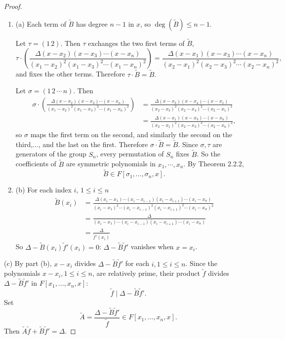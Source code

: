 \documentclass[11pt,a4paper]{article}
\newcommand{\be} {\begin{enumerate}}
\newcommand{\ee} {\end{enumerate}}
\begin{document}
\begin{proof}
\be
\item[(a)]
Each term of $\tilde{B}$ has degree $n-1$ in $x$, so $\deg(\tilde{B}) \leq n-1$.

Let $\tau = (1\, 2)$. Then $\tau$ exchanges the two first terms of $\tilde{B}$,
$$\tau \cdot \left( \frac{\Delta(x-x_2)(x-x_3)\cdots(x-x_n)}{(x_1-x_2)^2(x_1-x_3)^2\cdots(x_1-x_n)^2}\right) = \frac{\Delta(x-x_1)(x-x_3)\cdots(x-x_n)}{(x_2-x_1)^2(x_2-x_3)^2\cdots(x_2-x_n)^2},$$
and fixes the other terms. Therefore $\tau \cdot \tilde{B} = \tilde{B}.$

Let $\sigma = (1\,2\,\cdots\, n)$. Then 
\begin{align*}
\sigma \cdot \left( \frac{\Delta(x-x_2)(x-x_3)\cdots(x-x_n)}{(x_1-x_2)^2(x_1-x_3)^2\cdots(x_1-x_n)^2}\right) &= \frac{\Delta(x-x_3)(x-x_4)\cdots(x-x_1)}{(x_2-x_3)^2(x_2-x_4)^2\cdots(x_2-x_1)^2}\\
&=\frac{\Delta(x-x_1)(x-x_3)\cdots(x-x_n)}{(x_2-x_1)^2(x_2-x_3)^2\cdots(x_2-x_n)^2},
\end{align*}
so $\sigma$ maps the first term on the second, and similarly the second on the third,..., and the last on the first. Therefore $\sigma \cdot \tilde{B} = \tilde{B}$. 
Since $\sigma, \tau$ are generators of the group $S_n$, every permutation of $S_n$ fixes $\tilde{B}$. So the coefficients of $\tilde{B}$ are symmetric polynomials in $x_1,\cdots,x_n$. By Theorem 2.2.2, 
$$\tilde{B} \in F[\sigma_1,\ldots,\sigma_n,x].$$

\item[(b)] For each index $i$, $1\leq i \leq n$
\begin{align*}
\tilde{B}(x_i) &= \frac{\Delta(x_i - x_1)\cdots(x_i - x_{i-1})(x_i - x_{i+1})\cdots(x_i - x_n)}{(x_i - x_1)^2\cdots(x_i - x_{i-1})^2(x_i - x_{i+1})^2\cdots(x_i - x_n)^2}\\
&=\frac{\Delta}{(x_i - x_1)\cdots(x_i - x_{i-1})(x_i - x_{i+1})\cdots(x_i - x_n)}\\
&=\frac{\Delta}{\tilde{f}'(x_i)}
\end{align*}
So $\Delta - \tilde{B}(x_i) \tilde{f}'(x_i) = 0$: $\Delta - \tilde{B} \tilde{f}'$ vanishes when $x=x_i$.
\ee

\item[(c)] By part (b), $x-x_i$ divides $\Delta - \tilde{B} \tilde{f}'$ for each $i,1\leq i \leq n$. Since the polynomials $x-x_i, 1\leq i \leq n$, are relatively prime,
their product $\tilde{f}$ divides $\Delta - \tilde{B} \tilde{f}'$ in $F[x_1,\ldots,x_n,x]$:
$$\tilde{f} \mid \Delta - \tilde{B} \tilde{f}'.$$
Set
$$\tilde{A} = \frac{\Delta - \tilde{B} \tilde{f}'}{\tilde{f}} \in F[x_1,\ldots,x_n,x].$$
Then $\tilde{A} \tilde{f} + \tilde{B} \tilde{f}' = \Delta$.


\end{proof}
\end{document}
